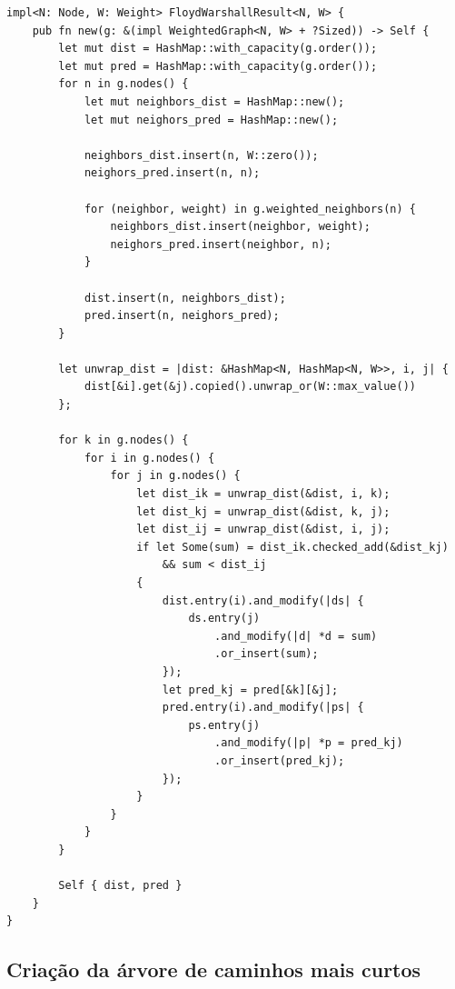 \begin{listing}[H]
  \caption{Implementação do algoritmo de Floyd-Warshall}
  \begin{verbatim}
impl<N: Node, W: Weight> FloydWarshallResult<N, W> {
    pub fn new(g: &(impl WeightedGraph<N, W> + ?Sized)) -> Self {
        let mut dist = HashMap::with_capacity(g.order());
        let mut pred = HashMap::with_capacity(g.order());
        for n in g.nodes() {
            let mut neighbors_dist = HashMap::new();
            let mut neighors_pred = HashMap::new();

            neighbors_dist.insert(n, W::zero());
            neighors_pred.insert(n, n);

            for (neighbor, weight) in g.weighted_neighbors(n) {
                neighbors_dist.insert(neighbor, weight);
                neighors_pred.insert(neighbor, n);
            }

            dist.insert(n, neighbors_dist);
            pred.insert(n, neighors_pred);
        }

        let unwrap_dist = |dist: &HashMap<N, HashMap<N, W>>, i, j| {
            dist[&i].get(&j).copied().unwrap_or(W::max_value())
        };

        for k in g.nodes() {
            for i in g.nodes() {
                for j in g.nodes() {
                    let dist_ik = unwrap_dist(&dist, i, k);
                    let dist_kj = unwrap_dist(&dist, k, j);
                    let dist_ij = unwrap_dist(&dist, i, j);
                    if let Some(sum) = dist_ik.checked_add(&dist_kj)
                        && sum < dist_ij
                    {
                        dist.entry(i).and_modify(|ds| {
                            ds.entry(j)
                                .and_modify(|d| *d = sum)
                                .or_insert(sum);
                        });
                        let pred_kj = pred[&k][&j];
                        pred.entry(i).and_modify(|ps| {
                            ps.entry(j)
                                .and_modify(|p| *p = pred_kj)
                                .or_insert(pred_kj);
                        });
                    }
                }
            }
        }

        Self { dist, pred }
    }
}
    \end{verbatim}
\end{listing}

\subsection{Criação da árvore de caminhos mais curtos}

